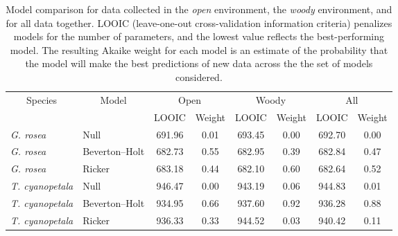 \begin{table}[h]
\caption{Model comparison for data collected in the \emph{open} environment, the \emph{woody} environment, and for all data together. LOOIC (leave-one-out cross-validation information criteria) penalizes models for the number of parameters, and the lowest value reflects the best-performing model. The resulting Akaike weight for each model is an estimate of the probability that the model will make the best predictions of new data across the the set of models considered.\label{tab:compare}} 
\begin{center}
\begin{tabular}{llcccccc}
\hline\hline
\multicolumn{1}{c}{\multirow{2}{*}{Species}}&\multicolumn{1}{c}{\multirow{2}{*}{Model}}&\multicolumn{2}{c}{Open}&\multicolumn{2}{c}{Woody}&\multicolumn{2}{c}{All}\\
& &\multicolumn{1}{c}{LOOIC}&\multicolumn{1}{c}{Weight}&\multicolumn{1}{c}{LOOIC}&\multicolumn{1}{c}{Weight}&\multicolumn{1}{c}{LOOIC}&\multicolumn{1}{c}{Weight}\tabularnewline
\hline
\emph{G. rosea}&Null&691.96&0.01&693.45&0.00&692.70&0.00\tabularnewline
\emph{G. rosea}&Beverton--Holt&682.73&0.55&682.95&0.39&682.84&0.47\tabularnewline
\emph{G. rosea}&Ricker&683.18&0.44&682.10&0.60&682.64&0.52\tabularnewline
\hline
\emph{T. cyanopetala}&Null&946.47&0.00&943.19&0.06&944.83&0.01\tabularnewline
\emph{T. cyanopetala}&Beverton--Holt&934.95&0.66&937.60&0.92&936.28&0.88\tabularnewline
\emph{T. cyanopetala}&Ricker&936.33&0.33&944.52&0.03&940.42&0.11\tabularnewline
\hline\hline
\end{tabular}\end{center}
\end{table}
